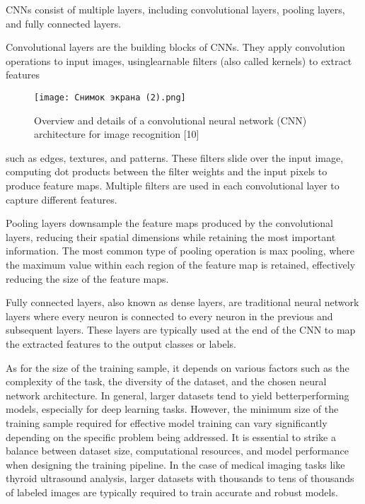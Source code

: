 \documentclass[a4paper,10pt,twocolumn]{article}
\begin{document}
CNNs consist of multiple layers, including convolutional layers, pooling layers, and fully connected layers.

Convolutional layers are the building blocks of CNNs. They apply convolution operations to input images, usinglearnable filters (also called kernels) to extract features

\begin{figure}[h]
                \centering
                \texttt{[image: Снимок экрана (2).png]}
                \caption{\scriptsize{Overview and details of a convolutional neural network
(CNN) architecture for image recognition [10]}}
                \label{fig:figure}
\end{figure}
such as edges, textures, and patterns. These filters slide
over the input image, computing dot products between
the filter weights and the input pixels to produce feature
maps. Multiple filters are used in each convolutional layer
to capture different features.

Pooling layers downsample the feature maps produced
by the convolutional layers, reducing their spatial dimensions while retaining the most important information.
The most common type of pooling operation is max
pooling, where the maximum value within each region
of the feature map is retained, effectively reducing the
size of the feature maps.

Fully connected layers, also known as dense layers, are
traditional neural network layers where every neuron is
connected to every neuron in the previous and subsequent
layers. These layers are typically used at the end of the
CNN to map the extracted features to the output classes
or labels.

As for the size of the training sample, it depends on
various factors such as the complexity of the task, the
diversity of the dataset, and the chosen neural network architecture. In general, larger datasets tend to yield betterperforming models, especially for deep learning tasks.
However, the minimum size of the training sample required for effective model training can vary significantly 
depending on the specific problem being addressed. It
is essential to strike a balance between dataset size,
computational resources, and model performance when
designing the training pipeline. In the case of medical
imaging tasks like thyroid ultrasound analysis, larger
datasets with thousands to tens of thousands of labeled
images are typically required to train accurate and robust
models.
\end{document}
